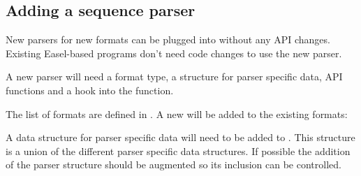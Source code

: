 






\subsection{Adding a sequence parser}

New parsers for new formats can be plugged into  without
any API changes. Existing Easel-based programs don't need code changes
to use the new parser.

A new parser will need a format type, a structure for parser specific
data, API functions and a hook into the  function.

The list of formats are defined in .  A new
 will be added to the existing formats:



A data structure for parser specific data will need to be added
to .  This structure is a union of the 
different parser specific data structures.  If possible the
addition of the parser structure should be augmented so its
inclusion can be controlled.

